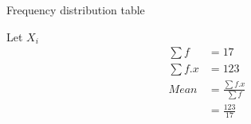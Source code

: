 \begin{table}[!ht]
\centering

\caption{Frequency distribution table }
\end{table}
Let $X_i$ 
\begin{align}
\sum{f} &= 17
\\
\sum{f.x} &= 123 
\\
Mean &= \frac{\sum{f.x}}{\sum{f}}
\\&= \frac{123}{17}
\end{align}
